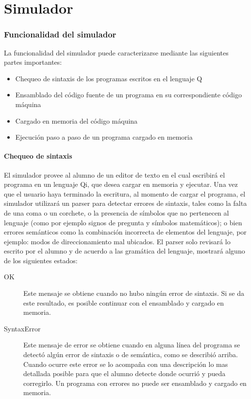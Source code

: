 \part{Simulador \qsim}


\section{Funcionalidad del simulador}

La funcionalidad del simulador puede caracterizarse mediante las siguientes partes importantes:

\begin{itemize}
\item Chequeo de sintaxis de los programas escritos en el lenguaje Q
\item Ensamblado del código fuente de un programa en su correspondiente código máquina
\item Cargado en memoria del código máquina
\item Ejecución paso a paso de un programa cargado en memoria
\end{itemize}

\subsection{Chequeo de sintaxis}

El simulador provee al alumno de un editor de texto en el cual escribirá el programa en un lenguaje Qi, que desea cargar en memoria y ejecutar.
Una vez que el usuario haya terminado la escritura, al momento de cargar el programa, el simulador utilizará un parser para detectar errores de sintaxis, tales como la falta de una coma o un corchete, o la presencia de símbolos que no pertenecen al lenguaje (como por ejemplo signos de pregunta y símbolos matemáticos); o bien errores semánticos como la combinación incorrecta de elementos del lenguaje, por ejemplo: modos de direccionamiento mal ubicados.
El parser solo revisará lo escrito por el alumno y de acuerdo a las gramática del lenguaje, mostrará alguno de los siguientes estados:

\begin{description}
\item[OK] Este mensaje se obtiene cuando no hubo ningún error de sintaxis. Si se da este resultado, es posible continuar con el ensamblado y cargado en memoria.
\item[SyntaxError] Este mensaje de error se obtiene cuando en alguna línea del programa se detectó algún error de sintaxis o de semántica, como se describió arriba. Cuando ocurre este error se lo acompaña con una descripción lo mas detallada posible para que el alumno detecte donde ocurrió y pueda corregirlo. Un programa con errores no puede ser ensamblado y cargado en memoria.
\end{description}


